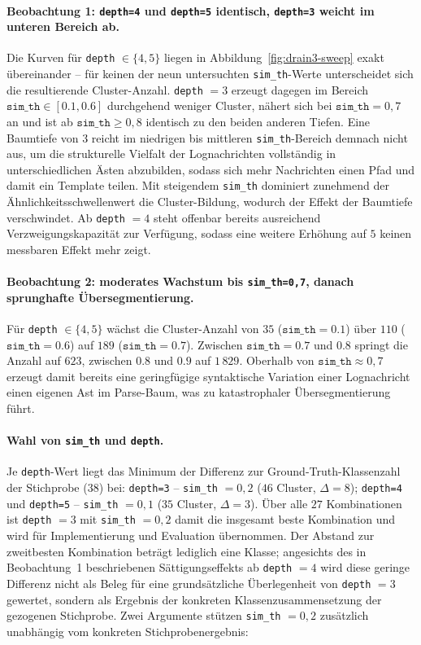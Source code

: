 \paragraph{Beobachtung 1: \texttt{depth=4} und \texttt{depth=5} identisch, \texttt{depth=3} weicht im unteren Bereich ab.}
Die Kurven für \texttt{depth} $\in \{4, 5\}$ liegen in
Abbildung~\ref{fig:drain3-sweep} exakt übereinander -- für keinen der neun
untersuchten \texttt{sim\_th}-Werte unterscheidet sich die resultierende
Cluster-Anzahl. \texttt{depth} $=3$ erzeugt dagegen im Bereich
$\texttt{sim\_th} \in [0{.}1, 0{.}6]$ durchgehend weniger Cluster,
nähert sich bei $\texttt{sim\_th} = 0{,}7$ an und
ist ab $\texttt{sim\_th} \geq 0{,}8$ identisch zu den beiden anderen Tiefen.
Eine Baumtiefe von $3$ reicht im niedrigen bis mittleren
\texttt{sim\_th}-Bereich demnach nicht aus, um die strukturelle Vielfalt der
Lognachrichten vollständig in unterschiedlichen Ästen abzubilden, sodass sich
mehr Nachrichten einen Pfad und damit ein Template teilen. Mit steigendem
\texttt{sim\_th} dominiert zunehmend der Ähnlichkeitsschwellenwert die
Cluster-Bildung, wodurch der Effekt der Baumtiefe verschwindet. Ab
\texttt{depth} $=4$ steht offenbar bereits ausreichend Verzweigungskapazität
zur Verfügung, sodass eine weitere Erhöhung auf $5$ keinen messbaren Effekt
mehr zeigt.

\paragraph{Beobachtung 2: moderates Wachstum bis \texttt{sim\_th=0,7}, danach sprunghafte Übersegmentierung.}
Für \texttt{depth} $\in \{4, 5\}$ wächst die Cluster-Anzahl von $35$
($\texttt{sim\_th}=0{.}1$) über $110$ ($\texttt{sim\_th}=0{.}6$) auf $189$
($\texttt{sim\_th}=0{.}7$). Zwischen $\texttt{sim\_th}=0{.}7$ und $0{.}8$ springt die
Anzahl auf $623$, zwischen $0{.}8$ und $0{.}9$ auf
$1\,829$. Oberhalb von $\texttt{sim\_th} \approx 0{,}7$
erzeugt damit bereits eine geringfügige syntaktische Variation einer
Lognachricht einen eigenen Ast im Parse-Baum, was zu katastrophaler
Übersegmentierung führt.

\paragraph{Wahl von \texttt{sim\_th} und \texttt{depth}.}
Je \texttt{depth}-Wert liegt das Minimum der Differenz zur
Ground-Truth-Klassenzahl der Stichprobe ($38$) bei: \texttt{depth=3} --
\texttt{sim\_th} $=0{,}2$ ($46$ Cluster, $\Delta = 8$); \texttt{depth=4} und
\texttt{depth=5} -- \texttt{sim\_th} $=0{,}1$ ($35$ Cluster, $\Delta = 3$).
Über alle $27$ Kombinationen ist \texttt{depth} $=3$ mit \texttt{sim\_th}
$=0{,}2$ damit die insgesamt beste Kombination und wird für Implementierung
und Evaluation übernommen. Der Abstand zur zweitbesten Kombination beträgt
lediglich eine Klasse; angesichts des in Beobachtung~1 beschriebenen
Sättigungseffekts ab \texttt{depth} $=4$ wird diese geringe Differenz nicht
als Beleg für eine grundsätzliche Überlegenheit von \texttt{depth} $=3$
gewertet, sondern als Ergebnis der konkreten Klassenzusammensetzung der
gezogenen Stichprobe. Zwei Argumente stützen \texttt{sim\_th} $=0{,}2$
zusätzlich unabhängig vom konkreten Stichprobenergebnis:


